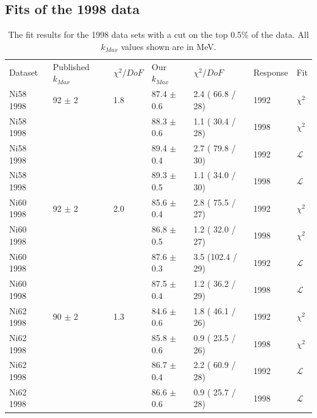 \subsection { Fits of the 1998 data }
\begin{table}[h]
  \begin{center}
    \begin{tabular}{|l||l|l|l|l|l|l|}
      \hline
      Dataset & Published $k_{Max}$ & $\chi^2 / DoF$ & Our $k_{Max}$ & $\chi^2 / DoF$  & Response & Fit \\
      \hhline{|=||=|=|=|=|=|=|}

      Ni58 1998 & 92   $\pm$ 2   & 1.8 & 87.4 $\pm$ 0.6 & 2.4 ( 66.8 / 28) & 1992 & $\chi^2$ \\
      Ni58 1998 &                &     & 88.3 $\pm$ 0.6 & 1.1 ( 30.4 / 28) & 1998 & $\chi^2$ \\
      Ni58 1998 &                &     & 89.4 $\pm$ 0.4 & 2.7 ( 79.8 / 30) & 1992 & $\mathcal{L}$ \\
      Ni58 1998 &                &     & 89.3 $\pm$ 0.5 & 1.1 ( 34.0 / 30) & 1998 & $\mathcal{L}$ \\
      \hline                           
      Ni60 1998 & 92   $\pm$ 2   & 2.0 & 85.6 $\pm$ 0.4 & 2.8 ( 75.5 / 27) & 1992 & $\chi^2$ \\
      Ni60 1998 &                &     & 86.8 $\pm$ 0.5 & 1.2 ( 32.0 / 27) & 1998 & $\chi^2$ \\
      Ni60 1998 &                &     & 87.6 $\pm$ 0.3 & 3.5 (102.4 / 29) & 1992 & $\mathcal{L}$ \\
      Ni60 1998 &                &     & 87.5 $\pm$ 0.4 & 1.2 ( 36.2 / 29) & 1998 & $\mathcal{L}$ \\
      \hline                           
      Ni62 1998 & 90   $\pm$ 2   & 1.3 & 84.6 $\pm$ 0.6 & 1.8 ( 46.1 / 26) & 1992 & $\chi^2$ \\
      Ni62 1998 &                &     & 85.8 $\pm$ 0.6 & 0.9 ( 23.5 / 26) & 1998 & $\chi^2$ \\
      Ni62 1998 &                &     & 86.7 $\pm$ 0.4 & 2.2 ( 60.9 / 28) & 1992 & $\mathcal{L}$ \\
      Ni62 1998 &                &     & 86.6 $\pm$ 0.6 & 0.9 ( 25.7 / 28) & 1998 & $\mathcal{L}$ \\
      \hline                           
    \end{tabular}
  \end{center}
  \caption{The fit results for the 1998 data sets with a cut on the top 0.5\% of the data. All $k_{Max}$ values shown are in MeV.}
  \label{table:fits1998}
\end{table}

